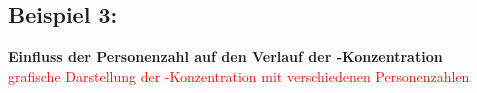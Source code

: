 \newpage

\subsection*{Beispiel 3:}
\textbf{Einfluss der Personenzahl auf den Verlauf der -Konzentration}\\

\textcolor{red}{grafische Darstellung der -Konzentration mit verschiedenen Personenzahlen}